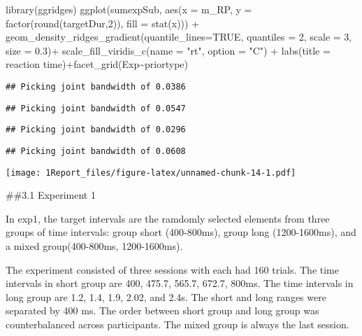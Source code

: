 \documentclass[
]{article}
\newenvironment{Shaded}{\begin{snugshade}}{\end{snugshade}}
\newcommand{\AttributeTok}[1]{\textcolor[rgb]{0.77,0.63,0.00}{#1}}
\newcommand{\ConstantTok}[1]{\textcolor[rgb]{0.00,0.00,0.00}{#1}}
\newcommand{\DecValTok}[1]{\textcolor[rgb]{0.00,0.00,0.81}{#1}}
\newcommand{\FloatTok}[1]{\textcolor[rgb]{0.00,0.00,0.81}{#1}}
\newcommand{\FunctionTok}[1]{\textcolor[rgb]{0.00,0.00,0.00}{#1}}
\newcommand{\NormalTok}[1]{#1}
\newcommand{\SpecialCharTok}[1]{\textcolor[rgb]{0.00,0.00,0.00}{#1}}
\newcommand{\StringTok}[1]{\textcolor[rgb]{0.31,0.60,0.02}{#1}}
\begin{document}
\begin{Shaded}
\begin{Highlighting}[]
\FunctionTok{library}\NormalTok{(}\StringTok{\textquotesingle{}ggridges\textquotesingle{}}\NormalTok{)}
\FunctionTok{ggplot}\NormalTok{(sumexpSub, }\FunctionTok{aes}\NormalTok{(}\AttributeTok{x =}\NormalTok{ m\_RP, }\AttributeTok{y =} \FunctionTok{factor}\NormalTok{(}\FunctionTok{round}\NormalTok{(targetDur,}\DecValTok{2}\NormalTok{)), }\AttributeTok{fill =} \FunctionTok{stat}\NormalTok{(x))) }\SpecialCharTok{+} 
\FunctionTok{geom\_density\_ridges\_gradient}\NormalTok{(}\AttributeTok{quantile\_lines=}\ConstantTok{TRUE}\NormalTok{, }\AttributeTok{quantiles =} \DecValTok{2}\NormalTok{, }\AttributeTok{scale =} \DecValTok{3}\NormalTok{, }\AttributeTok{size =} \FloatTok{0.3}\NormalTok{)}\SpecialCharTok{+}
\FunctionTok{scale\_fill\_viridis\_c}\NormalTok{(}\AttributeTok{name =} \StringTok{"rt"}\NormalTok{, }\AttributeTok{option =} \StringTok{"C"}\NormalTok{) }\SpecialCharTok{+}
\FunctionTok{labs}\NormalTok{(}\AttributeTok{title =} \StringTok{\textquotesingle{}reaction time\textquotesingle{}}\NormalTok{)}\SpecialCharTok{+}\FunctionTok{facet\_grid}\NormalTok{(Exp}\SpecialCharTok{\textasciitilde{}}\NormalTok{priortype)}
\end{Highlighting}
\end{Shaded}

\begin{verbatim}
## Picking joint bandwidth of 0.0386
\end{verbatim}

\begin{verbatim}
## Picking joint bandwidth of 0.0547
\end{verbatim}

\begin{verbatim}
## Picking joint bandwidth of 0.0296
\end{verbatim}

\begin{verbatim}
## Picking joint bandwidth of 0.0608
\end{verbatim}

\texttt{[image: 1Report\_files/figure-latex/unnamed-chunk-14-1.pdf]}

\#\#3.1 Experiment 1

In exp1, the target intervals are the ramdomly selected elements from
three groups of time intervals: group short (400-800ms), group long
(1200-1600ms), and a mixed group(400-800ms, 1200-1600ms).

The experiment consisted of three sessions with each had 160 trials. The
time intervals in short group are 400, 475.7, 565.7, 672.7, 800ms. The
time intervals in long group are 1.2, 1.4, 1.9, 2.02, and 2.4s. The
short and long ranges were separated by 400 ms. The order between short
group and long group was counterbalanced across participants. The mixed
group is always the last session.
\end{document}

